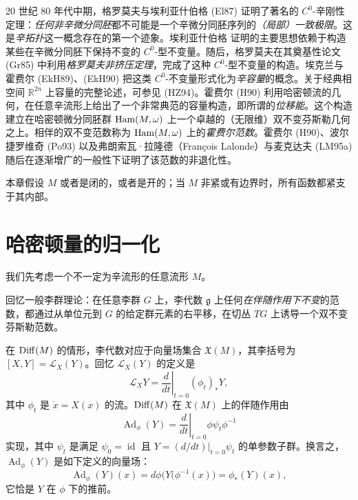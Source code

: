 20 世纪 80 年代中期，格罗莫夫与埃利亚什伯格 (El87) 证明了著名的
$C^0$-辛刚性定理：\emph{任何非辛微分同胚}都不可能是一个辛微分同胚序列的\emph{（局部）一致极限}。这是\emph{辛拓扑}这一概念存在的第一个迹象。埃利亚什伯格
证明的主要思想依赖于构造某些在辛微分同胚下保持不变的
$C^0$-型不变量。随后，格罗莫夫在其奠基性论文 (Gr85) 中利用\emph{格罗莫夫非挤压定理}，完成了这种 $C^0$-型不变量的构造。埃克兰与
霍费尔 (EkH89)、(EkH90) 把这类 $C^0$-不变量形式化为\emph{辛容量}的概念。关于经典相空间
$\mathbb R^{2n}$ 上容量的完整论述，可参见 (HZ94)。霍费尔 (H90) 利用哈密顿流的几何，在任意辛流形上给出了一个非常典范的容量构造，即所谓的\emph{位移能}。这个构造建立在哈密顿微分同胚群
$\operatorname{Ham}(M,\omega)$ 上一个卓越的（无限维）双不变芬斯勒几何之上。相伴的双不变范数称为 $\operatorname{Ham}(M,\omega)$ 上的\emph{霍费尔范数}。霍费尔 (H90)、波尔捷罗维奇 (Po93) 以及弗朗索瓦·拉隆德（François Lalonde）与麦克达夫 (LM95a) 随后在逐渐增广的一般性下证明了该范数的非退化性。

本章假设 $M$ 或者是闭的，或者是开的；当 $M$ 非紧或有边界时，所有函数都紧支于其内部。

\section{哈密顿量的归一化}
\label{sec:normalization-hamiltonians}

我们先考虑一个不一定为辛流形的任意流形 $M$。

回忆一般李群理论：在任意李群 $G$ 上，李代数 $\mathfrak g$ 上任何\emph{在伴随作用下不变}的范数，都通过从单位元到 $G$ 的给定群元素的右平移，在切丛 $TG$ 上诱导一个双不变芬斯勒范数。

在 $\operatorname{Diff}(M)$ 的情形，李代数对应于向量场集合 $\mathfrak X(M)$，其李括号为
$[X,Y]=\mathcal L_X(Y)$。回忆 $\mathcal L_X(Y)$ 的定义是
\[
 \mathcal L_XY=\left.\frac d{dt}\right|_{t=0}(\phi_t)_*Y,
\]
其中 $\phi_t$ 是 $\dot x=X(x)$ 的流。$\operatorname{Diff}(M)$ 在 $\mathfrak X(M)$ 上的伴随作用由
\[
 \operatorname{Ad}_\phi(Y)
 =\left.\frac d{dt}\right|_{t=0}\phi\psi_t\phi^{-1}
\]
实现，其中 $\psi_t$ 是满足 $\psi_0=\operatorname{id}$ 且
$Y=\left.(d/dt)\right|_{t=0}\psi_t$ 的单参数子群。换言之，
$\operatorname{Ad}_\phi(Y)$ 是如下定义的向量场：
\begin{equation}
 \operatorname{Ad}_\phi(Y)(x)
 =d\phi\bigl(Y(\phi^{-1}(x)\bigr)
 =\phi_*(Y)(x),
 \label{eq:adjoint-action-diffeomorphism}
\end{equation}
它恰是 $Y$ 在 $\phi$ 下的推前。

